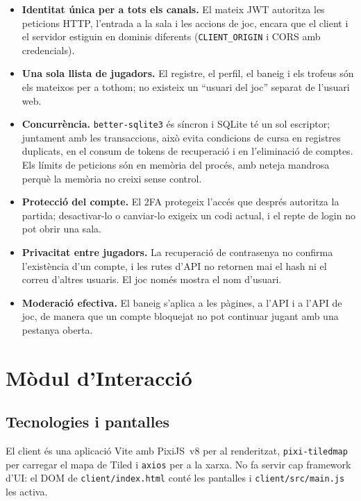 \documentclass[11pt,a4paper]{article}
\begin{document}
\begin{itemize}
  \item \textbf{Identitat única per a tots els canals.} El mateix JWT autoritza les
        peticions HTTP, l'entrada a la sala i les accions de joc, encara que el client
        i el servidor estiguin en dominis diferents (\texttt{CLIENT\_ORIGIN} i CORS
        amb credencials).
  \item \textbf{Una sola llista de jugadors.} El registre, el perfil, el baneig i els
        trofeus són els mateixos per a tothom; no existeix un \enquote{usuari del joc}
        separat de l'usuari web.
  \item \textbf{Concurrència.} \texttt{better-sqlite3} és síncron i SQLite té un sol
        escriptor; juntament amb les transaccions, això evita condicions de cursa en
        registres duplicats, en el consum de tokens de recuperació i en l'eliminació
        de comptes. Els límits de peticions són en memòria del procés, amb neteja
        mandrosa perquè la memòria no creixi sense control.
  \item \textbf{Protecció del compte.} El 2FA protegeix l'accés que després autoritza
        la partida; desactivar-lo o canviar-lo exigeix un codi actual, i el repte de
        login no pot obrir una sala.
  \item \textbf{Privacitat entre jugadors.} La recuperació de contrasenya no confirma
        l'existència d'un compte, i les rutes d'API no retornen mai el hash ni el
        correu d'altres usuaris. El joc només mostra el nom d'usuari.
  \item \textbf{Moderació efectiva.} El baneig s'aplica a les pàgines, a l'API i a
        l'API de joc, de manera que un compte bloquejat no pot continuar jugant amb una
        pestanya oberta.
\end{itemize}

\section{Mòdul d'Interacció}
\label{sec:interaccio}

\subsection{Tecnologies i pantalles}

El client és una aplicació Vite amb PixiJS\ v8 per al renderitzat, \texttt{pixi-tiledmap}
per carregar el mapa de Tiled i \texttt{axios} per a la xarxa. No fa servir cap
framework d'UI: el DOM de \texttt{client/index.html} conté les pantalles i
\texttt{client/src/main.js} les activa.
\end{document}
